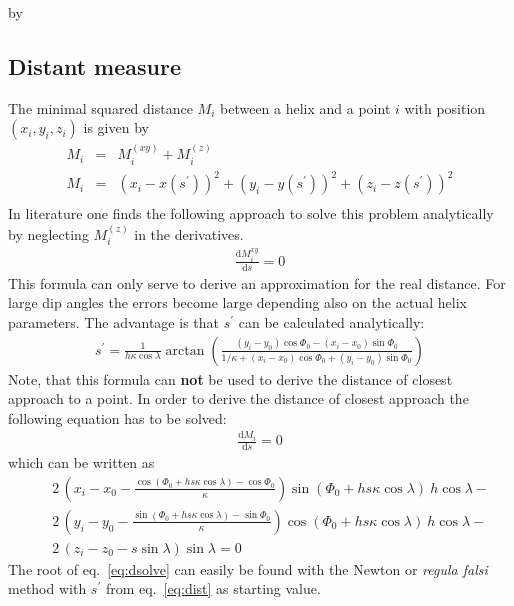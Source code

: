 \documentclass[twoside]{article}
\newcommand{\entrylabel}[1]{\mbox{\textbf{{#1}}}\hfil}%
\newenvironment{entry}
{\begin{list}{}%
    {\renewcommand{\makelabel}{\entrylabel}%
     \setlength{\labelwidth}{90pt}%
     \setlength{\leftmargin}{\labelwidth}
     \advance\leftmargin by \labelsep%
      }%
    }%
  {\end{list}}
\newcommand{\Entrylabel}[1]%
{\raisebox{0pt}[1ex][0pt]{\makebox[\labelwidth][l]%
    {\parbox[t]{\labelwidth}{\hspace{0pt}\textbf{{#1}}}}}}
\newenvironment{Entry}%
{\renewcommand{\entrylabel}{\Entrylabel}\begin{entry}}%
  {\end{entry}}
\begin{document}
\begin{description}
\begin{Entry}
\subsection{Distant measure}
The minimal squared distance $M_i$ between a helix and a
point $i$ with position $(x_i, y_i, z_i)$ is given by
\begin{eqnarray}
     M_i & = & M_i^{(xy)} + M_i^{(z)} \\
     M_i & = & (x_i - x(s^\prime))^2 + (y_i - y(s^\prime))^2 + (z_i - z(s^\prime))^2 \\
\end{eqnarray}
In literature one finds the following approach to solve this problem analytically
by neglecting $M_i^{(z)}$ in the derivatives.
\begin{eqnarray}
\frac{\mathrm{d}M_i^{xy}}{\mathrm{d}s}  = 0
\end{eqnarray}
This formula can only serve to derive an approximation for the real distance.
For large dip angles the errors become large depending also on the actual helix
parameters. The advantage is that $s^\prime$ can be calculated analytically:
\begin{eqnarray}
  s^\prime = \frac{1}{h \kappa \cos\lambda} \arctan \left(
    \frac{(y_i-y_0)\cos\Phi_0 - (x_i-x_0) \sin\Phi_0}
    {1/\kappa + (x_i-x_0) \cos\Phi_0 + (y_i-y_0)\sin\Phi_0} \right) \label{eq:dist}
\end{eqnarray}
Note, that this formula can {\bf not} be used to derive the distance of closest
approach to a point.
In order to derive the distance of closest approach the following equation
has to be solved:
\begin{eqnarray}
\frac{\mathrm{d}M_i}{\mathrm{d}s}  = 0
\end{eqnarray}
which can be written as
\begin{eqnarray}
&&2\,\left (x_i-x_0-{\frac {\cos(\Phi_0+h s
  \kappa\cos\lambda)-\cos\Phi_0}{\kappa}}\right) 
  \sin(\Phi_0+h s \kappa\cos\lambda)\ h\cos\lambda -  \nonumber \\
&&2\,\left (y_i-y_0-{\frac {\sin(\Phi_0+h s \kappa\cos\lambda)-\sin
  \Phi_0}{\kappa}}\right) 
  \cos(\Phi_0+ h s \kappa\cos\lambda)\ h\cos\lambda- \nonumber \\
&&2\,\left(z_i-z_0-s\sin\lambda\right )\sin\lambda = 0   \label{eq:dsolve}
\end{eqnarray}
The root of eq.~\ref{eq:dsolve} can easily be found with the Newton or
{\it regula falsi} method
with $s^\prime$ from eq.~\ref{eq:dist} as starting value.

\end{Entry}
\end{description}
\end{document}
